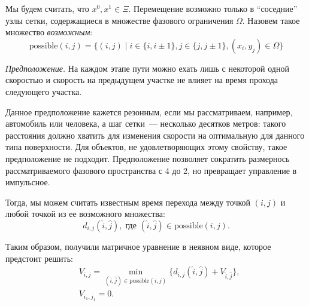 Мы будем считать, что $x^0,x^1 \in \Xi$. Перемещение возможно только в ``соседние'' узлы сетки, содержащиеся в множестве фазового ограничения $\Omega$. Назовем такое множество \textit{возможным}:
\[
    \mathrm{possible}(i,j) = \{
        (i, j) \;|\; i \in \{i, i \pm 1\}, j \in \{j, j \pm 1\}, (x_i,y_j) \in \Omega    
    \}
\]

\textit{Предположение.} На каждом этапе пути можно ехать лишь с некоторой одной скоростью и скорость на предыдущем участке не влияет на время прохода следующего участка.

Данное предположение кажется резонным, если мы рассматриваем, например, автомобиль или человека, а шаг сетки~--- несколько десятков метров: такого расстояния должно хватить для изменения скорости на оптимальную для данного типа поверхности. Для объектов, не удовлетворяющих этому свойству, такое предположение не подходит. Предположение позволяет сократить размернось рассматриваемого фазового пространства с 4 до 2, но превращает управление в импульсное.

Тогда, мы можем считать известным время перехода между точкой $(i,j)$ и любой точкой из ее возможного множества:
\[
    d_{i,j}(\hat i, \hat j),\;\mbox{где $(\hat i, \hat j) \in \mathrm{possible}(i,j)$}.
\]

Таким образом, получили матричное уравнение в неявном виде, которое предстоит решить:
\begin{equation}
    \begin{aligned}
        &V_{i,j} = \min\limits_{(\hat i, \hat j) \in \mathrm{possible}(i, j)}\{d_{i,j}(\hat i,\hat j) + V_{\hat i, \hat j}\}, \\
        &V_{i_1, j_1} = 0.
    \end{aligned}
\end{equation}